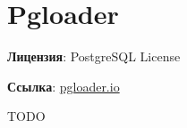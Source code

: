 \section{Pgloader}
\textbf{Лицензия}: PostgreSQL License

\textbf{Ссылка}: \href{http://pgloader.io/}{pgloader.io}

TODO